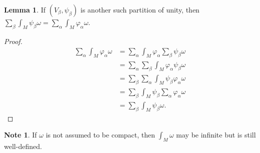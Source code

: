 \documentclass[10pt,letterpaper,cm]{nupset}
\theoremstyle{definition}
\newtheorem{note}[definition]{Note}
\theoremstyle{theorem}
\newtheorem{lemma}[definition]{Lemma}
\theoremstyle{remark}
\newcommand{\1}{\mathbf{1}}
\newcommand{\0}{\vec 0}
\begin{document}
\begin{lemma}
If $\left(V_{\beta}, \psi_{\beta}\right)$ is another such partition of unity, then $\sum_{\beta}\int_M\psi_{\beta} \omega = \sum_{\alpha}  \int_M \varphi_{\alpha} \omega$.
\end{lemma}
\begin{proof}
\begin{align*}
 \sum_{\alpha}  \int_M \varphi_{\alpha} \omega
& =  \sum_{\alpha}  \int_M \varphi_{\alpha} \sum_{\beta} \psi_{\beta} \omega
\\ & = \sum_{\alpha} \sum_{\beta} \int_M \varphi_{\alpha} \psi_{\beta} \omega
\\ & = \sum_{\beta} \sum_{\alpha} \int_M \psi_{\beta} \varphi_{\alpha} \omega
\\ & = \sum_{\beta}  \int_M \psi_{\beta} \sum_{\alpha} \varphi_{\alpha} \omega
\\ & = \sum_{\beta}\int_M\psi_{\beta} \omega. 
\end{align*}
\end{proof}

\begin{note}
If $\omega$ is not assumed to be compact, then $\int_M \omega$ may be infinite but is still well-defined.
\end{note}
\end{document}
